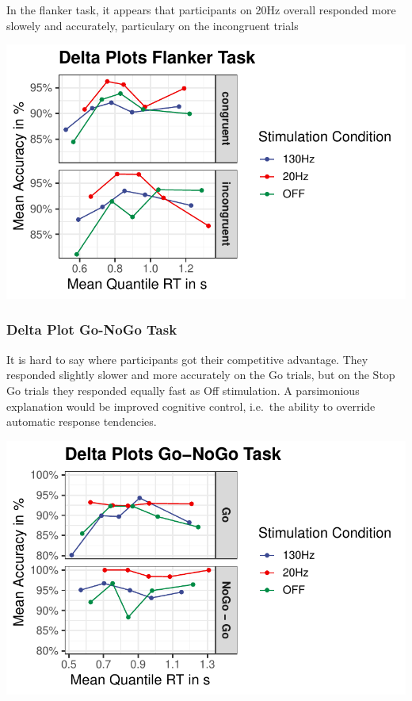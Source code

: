 \documentclass[
  letterpaper,
  DIV=11,
  numbers=noendperiod]{scrartcl}
\begin{document}
In the flanker task, it appears that participants on 20Hz overall
responded more slowely and accurately, particulary on the incongruent
trials

\includegraphics{MF_01_Modelfree_Analysis_files/figure-pdf/unnamed-chunk-13-1.pdf}

\hypertarget{delta-plot-go-nogo-task}{%
\subsubsection{Delta Plot Go-NoGo Task}\label{delta-plot-go-nogo-task}}

It is hard to say where participants got their competitive advantage.
They responded slightly slower and more accurately on the Go trials, but
on the Stop Go trials they responded equally fast as Off stimulation. A
parsimonious explanation would be improved cognitive control, i.e.~the
ability to override automatic response tendencies.

\includegraphics{MF_01_Modelfree_Analysis_files/figure-pdf/unnamed-chunk-14-1.pdf}
\end{document}
